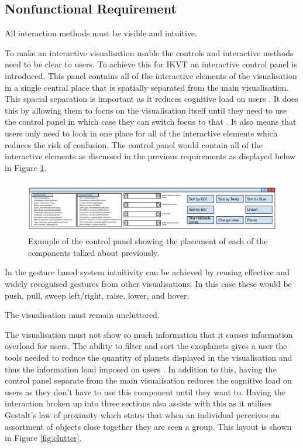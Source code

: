 \subsection{Nonfunctional Requirement}

\begin{enumerate}


{\bf \item[R6.] All interaction methods must be visible and intuitive.}

To make an interactive visualisation usable the controls and interactive
methods need to be clear to users. To achieve this for IKVT an interactive
control panel
is introduced. This panel contains all of the interactive elements
of the visualisation in a single central place that is spatially separated from
the main visualisation. This spacial separation is important as it reduces
cognitive load on users \cite{InformationCapacity}. It does this by allowing
them to focus on the
visualisation itself
until they need to use the control panel in which case they can switch focus to
that \cite{mendel}. It also
means that users only need to look in one place for all of the interactive
elements which reduces the risk of confusion. The
control panel would contain all of the interactive elements as discussed in
the previous requirements as displayed below in Figure
\ref{fig:interactionPanelMock}.

\begin{figure}[H]
  \centering
      \includegraphics[width=1\textwidth]{images/allTogether.png}
  \caption[Example of the control panel]{Example of the control panel showing
the placement of each of the components talked about previously.}  
  \label{fig:interactionPanelMock}
\end{figure}

In the gesture based system intuitivity can be achieved by reusing effective and
widely recognised gestures from other visualisations. In this case these would
be push, pull, sweep left/right, raise, lower, and hover.
\clearpage
{\bf \item[R7.] The visualisation must remain uncluttered.}

The visualisation must not show so much information that it
causes information overload for users. The ability to filter and sort the
exoplanets gives a user the tools needed to
reduce the quantity of planets displayed in the visualisation and thus the
information load imposed on users \cite{lewis}. In addition to this, having the
control
panel separate from the main visualisation reduces the cognitive
load on users as they don't have to use this component until they want to.
Having the interaction broken up into three sections also assists with this as
it
utilises Gestalt's law of proximity \cite{withinSubject} which states that when
an
individual perceives an assortment of objects close together they are seen a
group. This layout is shown in Figure \ref{fig:clutter}.


\end{enumerate}
